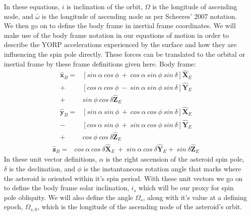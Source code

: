 \documentclass[12pt,notitlepage]{article}
\begin{document}
In these equations, $i$ is inclination of the orbit, $\Omega$ is the longitude of ascending node, and $\bar{\omega}$ is the longitude of ascending node as per Scheeres' 2007 notation. 
We then go on to define the body frame in inertial frame coordinates. We will make use of the body frame notation in our equations of motion in order to describe the YORP accelerations experienced by the surface and how they are influencing the spin pole directly. These forces can be translated to the orbital or inertial frame by these frame definitions given here. 
Body frame:
\begin{equation}
    \begin{split}
    \mathbf{\hat{x}}_B = &[sin \: \alpha \: cos \: \phi \: + \: cos \: \alpha \: sin \: \phi \: sin \: \delta]\mathbf{\hat{X}}_E \\
    + &[cos \: \alpha \: cos \: \phi \: - \: sin \: \alpha \: sin \: \phi \: sin \: \delta]\mathbf{\hat{Y}}_E \\
    + &sin \: \phi \: cos \: \delta \mathbf{\hat{Z}}_E
    \end{split}
\end{equation}
\begin{equation}
    \begin{split}
    \mathbf{\hat{y}}_B = &[sin \: \alpha \: sin \: \phi \: + \: cos \: \alpha \: cos \: \phi \: sin \: \delta]\mathbf{\hat{X}}_E \\
    - &[cos \: \alpha \: sin \: \phi \: + \: sin \: \alpha \: cos \: \phi \: sin \: \delta]\mathbf{\hat{Y}}_E \\
    + &cos \: \phi \: cos \: \delta \mathbf{\hat{Z}}_E
    \end{split}
\end{equation}
\begin{equation}
    \begin{split}
    \mathbf{\hat{z}}_B = &cos \: \alpha \: cos\: \delta\mathbf{\hat{X}}_E \:+ \: sin \: \alpha \: cos \: \delta\mathbf{\hat{Y}}_E  + \: sin \: \delta \mathbf{\hat{Z}}_E
    \end{split}
\end{equation}
In these unit vector definitions, $\alpha$ is the right ascension of the asteroid spin pole, $\delta$ is the declination, and $\phi$ is the instantaneous rotation angle that marks where the asteroid is oriented within it's spin period. With these unit vectors we go on to define the body frame solar inclination, $i_s$ which will be our proxy for spin pole obliquity. We will also define the angle $\Omega_s$, along with it's value at a defining epoch, $\Omega_{s,0}$, which is the longitude of the ascending node of the asteroid's orbit.
\end{document}
